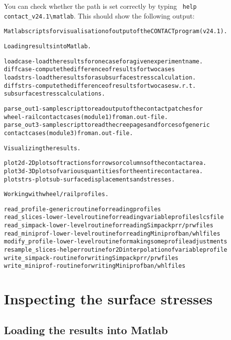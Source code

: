 \documentclass[12pt]{report}
\begin{document}
You can check whether the path is set correctly by typing
\verb+ help contact_v24.1\matlab+. This should show the following output:
\begin{alltt}\small
Matlab scripts for visualisation of output of the CONTACT program (v24.1).

Loading results into Matlab.

  loadcase   - load the results for one case for a given experiment name.
  diffcase   - compute the difference of results for two cases
  loadstrs   - load the results for a subsurface stress calculation.
  diffstrs   - compute the difference of results for two cases w.r.t.
               subsurface stress calculations.

  parse_out1 - sample script to read output of the contact patches for
               wheel-rail contact cases (module 1) from an .out-file.
  parse_out3 - sample script to read the creepages and forces of generic
               contact cases (module 3) from an .out-file.

Visualizing the results.

  plot2d     - 2D plots of tractions for rows or columns of the contact area.
  plot3d     - 3D plots of various quantities for the entire contact area.
  plotstrs   - plot sub-surface displacements and stresses.

Working with wheel/rail profiles.

  read_profile    - generic routine for reading profiles
  read_slices     - lower-level routine for reading variable profile slcs file
  read_simpack    - lower-level routine for reading Simpack prr/prw files
  read_miniprof   - lower-level routine for reading Miniprof ban/whl files
  modify_profile  - lower-level routine for making some profile adjustments
  resample_slices - helper routine for 2D interpolation of variable profile
  write_simpack   - routine for writing Simpack prr/prw files
  write_miniprof  - routine for writing Miniprof ban/whl files
\end{alltt}

\section{Inspecting the surface stresses}
\label{sec:plot_surf}

\subsection{Loading the results into Matlab}
\end{document}
